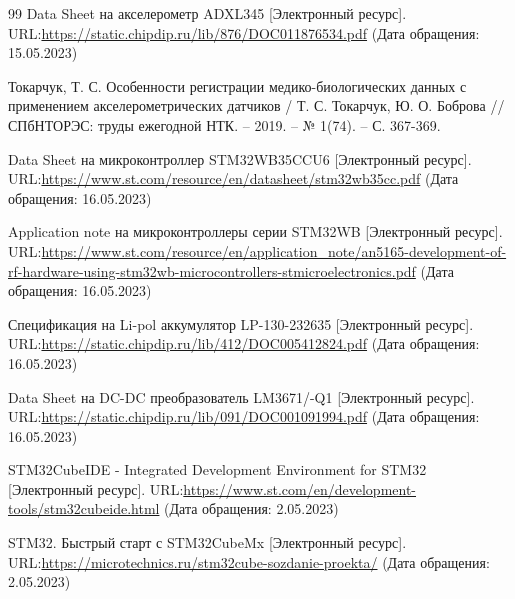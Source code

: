 \newpage
\renewcommand\refname{\centering СПИСОК ИСПОЛЬЗОВАННЫХ ИСТОЧНИКОВ}
\begin {thebibliography} {99}
Data Sheet на акселерометр ADXL345  [Электронный ресурс]. URL:\href{https://static.chipdip.ru/lib/876/DOC011876534.pdf}{https://static.chipdip.ru/lib/876/DOC011876534.pdf} (Дата обращения: 15.05.2023)

Токарчук, Т. С. Особенности регистрации медико-биологических данных с применением акселерометрических датчиков / Т. С. Токарчук, Ю. О. Боброва // СПбНТОРЭС: труды ежегодной НТК. – 2019. – № 1(74). – С. 367-369. 

Data Sheet на микроконтроллер STM32WB35CCU6  [Электронный ресурс]. URL:\href{https://www.st.com/resource/en/datasheet/stm32wb35cc.pdf}{https://www.st.com/resource/en/datasheet/stm32wb35cc.pdf} (Дата обращения: 16.05.2023)


Application note на микроконтроллеры серии STM32WB  [Электронный ресурс]. URL:\href{https://www.st.com/resource/en/application_note/an5165-development-of-rf-hardware-using-stm32wb-microcontrollers-stmicroelectronics.pdf}{https://www.st.com/resource/en/application\_note/an5165-development-of-rf-hardware-using-stm32wb-microcontrollers-stmicroelectronics.pdf} (Дата обращения: 16.05.2023)


Спецификация на Li-pol аккумулятор LP-130-232635  [Электронный ресурс]. URL:\href{https://static.chipdip.ru/lib/412/DOC005412824.pdf}{https://static.chipdip.ru/lib/412/DOC005412824.pdf} (Дата обращения: 16.05.2023)

Data Sheet на DC-DC преобразователь LM3671/-Q1  [Электронный ресурс]. URL:\href{https://static.chipdip.ru/lib/091/DOC001091994.pdf}{https://static.chipdip.ru/lib/091/DOC001091994.pdf} (Дата обращения: 16.05.2023)


STM32CubeIDE - Integrated Development Environment for STM32 [Электронный ресурс]. URL:\href{https://www.st.com/en/development-tools/stm32cubeide.html}{https://www.st.com/en/development-tools/stm32cubeide.html} (Дата обращения: 2.05.2023)


\bibitem {}
STM32. Быстрый старт с STM32CubeMx  [Электронный ресурс]. URL:\href{https://microtechnics.ru/stm32cube-sozdanie-proekta/}{https://microtechnics.ru/stm32cube-sozdanie-proekta/} (Дата обращения: 2.05.2023)







\end {thebibliography}



